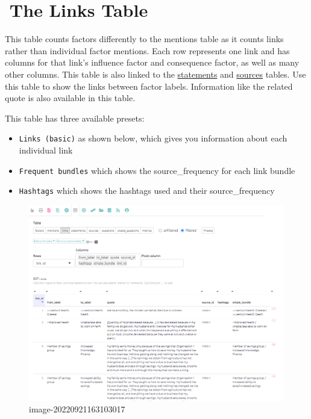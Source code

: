 \documentclass[
]{book}
\begin{document}
\hypertarget{xthe-links-table}{%
\chapter{🧪The Links Table}\label{xthe-links-table}}

This table counts factors differently to the mentions table as it counts links rather than individual factor mentions. Each row represents one link and has columns for that link's influence factor and consequence factor, as well as many other columns. This table is also linked to the \protect\hyperlink{xthe-statements-table}{statements} and \protect\hyperlink{xthe-sources-table}{sources} tables. Use this table to show the links between factor labels. Information like the related quote is also available in this table.

This table has three available presets:

\begin{itemize}
\item
  \texttt{Links\ (basic)} as shown below, which gives you information about each individual link
\item
  \texttt{Frequent\ bundles} which shows the source\_frequency for each link bundle
\item
  \texttt{Hashtags} which shows the hashtags used and their source\_frequency
\end{itemize}

\begin{figure}
\centering
\includegraphics[width=6.77083in,height=\textheight]{_assets/image-20220921163103017.png}
\caption{image-20220921163103017}
\end{figure}
\end{document}
